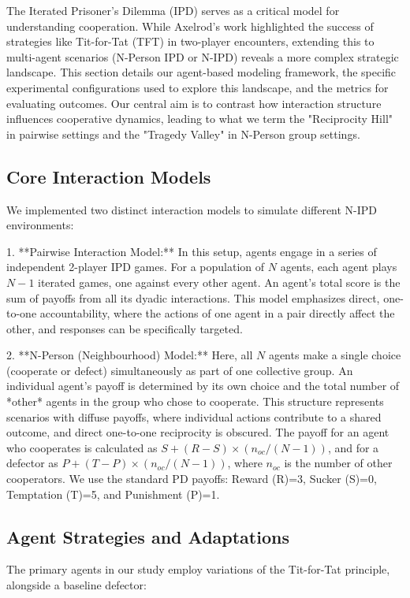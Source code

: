 \documentclass[]{llncs} %
\begin{document}
The Iterated Prisoner's Dilemma (IPD) serves as a critical model for understanding cooperation. While Axelrod's work highlighted the success of strategies like Tit-for-Tat (TFT) in two-player encounters, extending this to multi-agent scenarios (N-Person IPD or N-IPD) reveals a more complex strategic landscape. This section details our agent-based modeling framework, the specific experimental configurations used to explore this landscape, and the metrics for evaluating outcomes. Our central aim is to contrast how interaction structure influences cooperative dynamics, leading to what we term the "Reciprocity Hill" in pairwise settings and the "Tragedy Valley" in N-Person group settings.

\subsection{Core Interaction Models}
We implemented two distinct interaction models to simulate different N-IPD environments:

1.  **Pairwise Interaction Model:** In this setup, agents engage in a series of independent 2-player IPD games. For a population of $N$ agents, each agent plays $N-1$ iterated games, one against every other agent. An agent's total score is the sum of payoffs from all its dyadic interactions. This model emphasizes direct, one-to-one accountability, where the actions of one agent in a pair directly affect the other, and responses can be specifically targeted.

2.  **N-Person (Neighbourhood) Model:** Here, all $N$ agents make a single choice (cooperate or defect) simultaneously as part of one collective group. An individual agent's payoff is determined by its own choice and the total number of *other* agents in the group who chose to cooperate. This structure represents scenarios with diffuse payoffs, where individual actions contribute to a shared outcome, and direct one-to-one reciprocity is obscured. The payoff for an agent who cooperates is calculated as $S + (R - S) \times (n_{oc} / (N - 1))$, and for a defector as $P + (T - P) \times (n_{oc} / (N - 1))$, where $n_{oc}$ is the number of other cooperators. We use the standard PD payoffs: Reward (R)=3, Sucker (S)=0, Temptation (T)=5, and Punishment (P)=1.

\subsection{Agent Strategies and Adaptations}
The primary agents in our study employ variations of the Tit-for-Tat principle, alongside a baseline defector:
\end{document}
